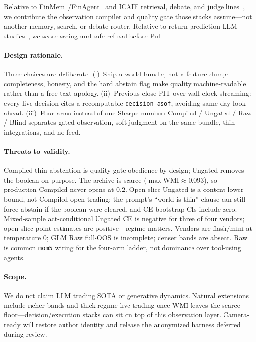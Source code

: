 \documentclass[sigconf,anonymous]{acmart}
\theoremstyle{acmdefinition}%
\theoremstyle{acmplain}%
\begin{document}
Relative to FinMem~/FinAgent~\cite{yu2023finmem,zhang2024finagent} and ICAIF retrieval, debate, and judge lines~\cite{choi2025finagentbench,shen2025finsearch,sun2025finresearchbench,duan2025factormad}, we contribute the observation compiler and quality gate those stacks assume---not another memory, search, or debate router. Relative to return-prediction LLM studies~\cite{lopez2023chatgpt}, we score seeing and safe refusal before PnL.

\paragraph{Design rationale.}
Three choices are deliberate. (i)~Ship a world bundle, not a feature dump: completeness, honesty, and the hard abstain flag make quality machine-readable rather than a free-text apology. (ii)~Previous-close PIT over wall-clock streaming: every live decision cites a recomputable \texttt{decision\_asof}, avoiding same-day look-ahead. (iii)~Four arms instead of one Sharpe number: Compiled / Ungated / Raw / Blind separates gated observation, soft judgment on the same bundle, thin integrations, and no feed.

\paragraph{Threats to validity.}
Compiled thin abstention is quality-gate obedience by design; Ungated removes the boolean on purpose.
The archive is scarce (\(\max\mathrm{WMI}\approx 0.093\)), so production Compiled never opens at \(0.2\).
Open-slice Ungated is a content lower bound, not Compiled-open trading: the prompt's ``world is thin'' clause can still force abstain if the boolean were cleared, and CE bootstrap CIs include zero.
Mixed-sample act-conditional Ungated CE is negative for three of four vendors; open-slice point estimates are positive---regime matters.
Vendors are flash/mini at temperature \(0\); GLM Raw full-OOS is incomplete; denser bands are absent.
Raw is common \texttt{mom5} wiring for the four-arm ladder, not dominance over tool-using agents.

\paragraph{Scope.}
We do not claim LLM trading SOTA or generative dynamics. Natural extensions include richer bands and thick-regime live trading once WMI leaves the scarce floor---decision/execution stacks can sit on top of this observation layer. Camera-ready will restore author identity and release the anonymized harness deferred during review.
\end{document}
